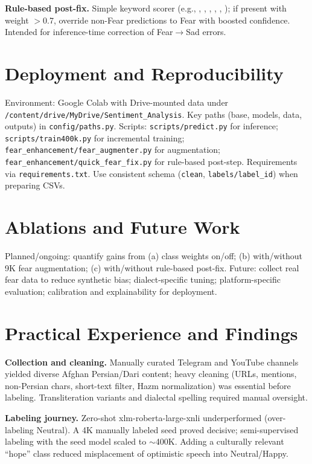 \documentclass[11pt]{article}
\begin{document}
\textbf{Rule-based post-fix.} Simple keyword scorer (e.g., , , , , , ); if present with weight \(>\)0.7, override non-Fear predictions to Fear with boosted confidence. Intended for inference-time correction of Fear\(\rightarrow\)Sad errors.

\section{Deployment and Reproducibility}
Environment: Google Colab with Drive-mounted data under \texttt{/content/drive/MyDrive/Sentiment\_Analysis}. Key paths (base, models, data, outputs) in \texttt{config/paths.py}. Scripts: \texttt{scripts/predict.py} for inference; \texttt{scripts/train400k.py} for incremental training; \texttt{fear\_enhancement/fear\_augmenter.py} for augmentation; \texttt{fear\_enhancement/quick\_fear\_fix.py} for rule-based post-step. Requirements via \texttt{requirements.txt}. Use consistent schema (\texttt{clean}, \texttt{labels/label\_id}) when preparing CSVs.

\section{Ablations and Future Work}
Planned/ongoing: quantify gains from (a) class weights on/off; (b) with/without 9K fear augmentation; (c) with/without rule-based post-fix. Future: collect real fear data to reduce synthetic bias; dialect-specific tuning; platform-specific evaluation; calibration and explainability for deployment.

\section{Practical Experience and Findings}
\textbf{Collection and cleaning.} Manually curated Telegram and YouTube channels yielded diverse Afghan Persian/Dari content; heavy cleaning (URLs, mentions, non-Persian chars, short-text filter, Hazm normalization) was essential before labeling. Transliteration variants and dialectal spelling required manual oversight.

\textbf{Labeling journey.} Zero-shot xlm-roberta-large-xnli underperformed (over-labeling Neutral). A 4K manually labeled seed proved decisive; semi-supervised labeling with the seed model scaled to \(\sim\)400K. Adding a culturally relevant ``hope'' class reduced misplacement of optimistic speech into Neutral/Happy.
\end{document}
